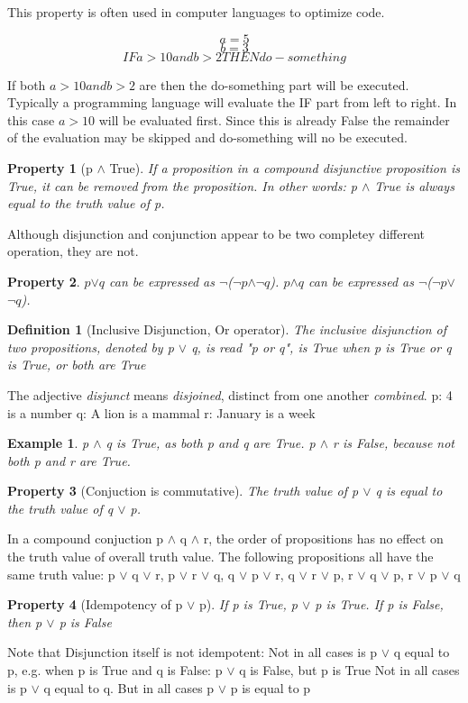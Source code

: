 \documentclass[10pt,a4paper,draft,titlepage,onecolumn]{book}
\newtheorem{definition}{Definition}[subsection]
\newtheorem{example}{Example}[section]
\newtheorem{property}{Property}[section]
\begin{document}
This property is often used in computer languages to optimize code.

$$a = 5$$
$$b = 3$$
$$IF  a > 10  and b > 2 THEN do-something$$
		
If both $a > 10  and  b > 2$ are then the do-something part will be executed. 
Typically a programming language will evaluate the IF part from left to right. 
In this case $a > 10$ will be evaluated first. Since this is already False the remainder of the evaluation may be skipped and do-something will no be executed.

\begin{property}[p $\wedge$  True]  If a proposition in a compound disjunctive proposition is True, it can be removed from the proposition. In other words: p $\wedge$  True is always equal to the truth value of p.
\end{property}

Although disjunction and conjunction appear to be two completey different operation, they are not. 
\begin{property}
$p${$\vee$}$q$ can be expressed as {$\neg$}({$\neg$}$p${$\wedge$}{$\neg$}$q$). 
$p${$\wedge$}$q$ can be expressed as {$\neg$}({$\neg$}$p${$\vee$}{$\neg$}$q$).

\end{property}



\begin{definition}[Inclusive Disjunction, Or operator] The inclusive disjunction of two propositions, denoted by p $\vee$ q, is read "p or q", is True when p is True or q is True, or both are True
\end{definition} 
The adjective \textit{disjunct} means \textit{disjoined}, {distinct from one another} \textit{combined}.
p: 4 is a number
q: A lion is a mammal 
r: January is a week


\begin{example}
p $\wedge$ q is True, as both p and q are True.
p $\wedge$ r is False, because not both p and r are True.
\end{example}

\begin{property}[Conjuction is commutative] The truth value of p $\vee$  q is equal to the truth value of q $\vee$ p.
\end{property}
In a compound conjuction p $\wedge$ q $\wedge$ r, the order of propositions has no effect on the truth value of overall truth value. The following propositions all have the same truth value:
p $\vee$ q $\vee$ r,
p $\vee$ r $\vee$ q,
q $\vee$ p $\vee$ r,
q $\vee$ r $\vee$ p,
r $\vee$ q $\vee$ p,
r $\vee$ p $\vee$ q
\begin{property}[Idempotency of p $\vee$  p] If p is True, p $\vee$ p is True. If p is False, then p $\vee$ p is False
\end{property}
Note that Disjunction itself is not idempotent: 
Not in all cases is  p $\vee$ q equal to p, e.g. when p is True and q is False: p $\vee$ q is False, but p is True
Not in all cases is  p $\vee$ q equal to q. 
But in all cases   p $\vee$ p is equal to p 
\end{document}
